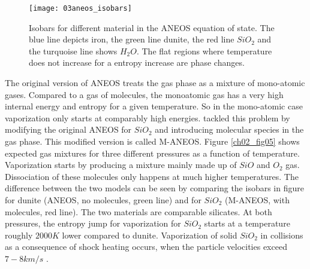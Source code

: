 \begin{figure}
\begin{center}
\texttt{[image: 03aneos\_isobars]}
\caption{Isobars for different material in the ANEOS equation of state. The blue line depicts iron, the green line dunite, the red line $SiO_2$ and the turquoise line shows $H_2 O$. The flat regions where temperature does not increase for a entropy increase are phase changes. }
\label{ch02_fig03}
\end{center}
\end{figure}

The original version of ANEOS treats the gas phase as a mixture of mono-atomic gases. Compared to a gas of molecules, the monoatomic gas has a very high internal energy and entropy for a given temperature. So in the mono-atomic case vaporization only starts at comparably high energies. \cite{Melosh:2007p3502} tackled this problem by modifying the original ANEOS for $SiO_2$ and introducing molecular species in the gas phase. This modified version is called M-ANEOS. Figure \ref{ch02_fig05} shows expected gas mixtures for three different pressures as a function of temperature. Vaporization starts by producing a mixture mainly made up of $SiO$ and $O_2$ gas. Dissociation of these molecules only happens at much higher temperatures. The difference between the two models can be seen by comparing the isobars in figure for dunite (ANEOS, no molecules, green line) and for $SiO_2$ (M-ANEOS, with molecules, red line). The two materials are comparable silicates. At both pressures, the entropy jump for vaporization for $SiO_2$ starts at a temperature roughly $2000K$ lower compared to dunite. Vaporization of solid $SiO_2$ in collisions as a consequence of shock heating occurs, when the particle velocities exceed $7-8km/s$ \citep{Melosh:2007p3502}.

